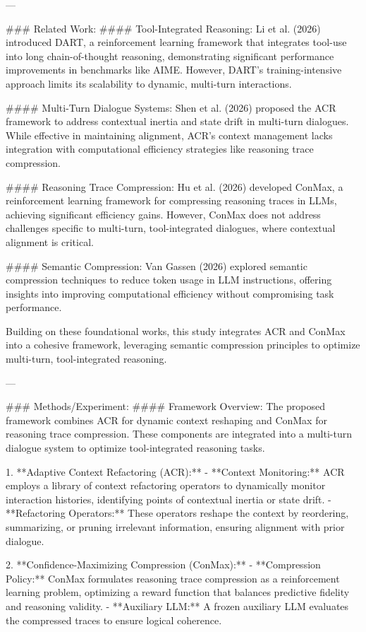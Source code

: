 ---

### Related Work:
#### Tool-Integrated Reasoning:
Li et al. (2026) introduced DART, a reinforcement learning framework that integrates tool-use into long chain-of-thought reasoning, demonstrating significant performance improvements in benchmarks like AIME. However, DART's training-intensive approach limits its scalability to dynamic, multi-turn interactions.

#### Multi-Turn Dialogue Systems:
Shen et al. (2026) proposed the ACR framework to address contextual inertia and state drift in multi-turn dialogues. While effective in maintaining alignment, ACR's context management lacks integration with computational efficiency strategies like reasoning trace compression.

#### Reasoning Trace Compression:
Hu et al. (2026) developed ConMax, a reinforcement learning framework for compressing reasoning traces in LLMs, achieving significant efficiency gains. However, ConMax does not address challenges specific to multi-turn, tool-integrated dialogues, where contextual alignment is critical.

#### Semantic Compression:
Van Gassen (2026) explored semantic compression techniques to reduce token usage in LLM instructions, offering insights into improving computational efficiency without compromising task performance.

Building on these foundational works, this study integrates ACR and ConMax into a cohesive framework, leveraging semantic compression principles to optimize multi-turn, tool-integrated reasoning.

---

### Methods/Experiment:
#### Framework Overview:
The proposed framework combines ACR for dynamic context reshaping and ConMax for reasoning trace compression. These components are integrated into a multi-turn dialogue system to optimize tool-integrated reasoning tasks.

1. **Adaptive Context Refactoring (ACR):**
   - **Context Monitoring:** ACR employs a library of context refactoring operators to dynamically monitor interaction histories, identifying points of contextual inertia or state drift.
   - **Refactoring Operators:** These operators reshape the context by reordering, summarizing, or pruning irrelevant information, ensuring alignment with prior dialogue.

2. **Confidence-Maximizing Compression (ConMax):**
   - **Compression Policy:** ConMax formulates reasoning trace compression as a reinforcement learning problem, optimizing a reward function that balances predictive fidelity and reasoning validity.
   - **Auxiliary LLM:** A frozen auxiliary LLM evaluates the compressed traces to ensure logical coherence.


